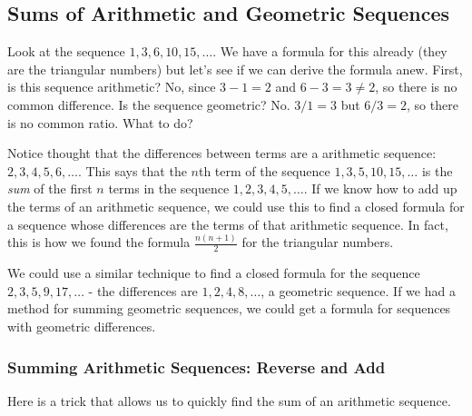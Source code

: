 \documentclass[12pt]{article}
\begin{document}
\subsection{Sums of Arithmetic and Geometric Sequences}

Look at the sequence $1, 3, 6, 10, 15,\ldots$.  We have a formula for this already (they are the triangular numbers) but let's see if we can derive the formula anew.  First, is this sequence arithmetic?  No, since $3-1 = 2$ and $6-3 = 3 \ne 2$, so there is no common difference.  Is the sequence geometric?  No.  $3/1 = 3$ but $6/3 = 2$, so there is no common ratio.  What to do?  

Notice thought that the differences between terms are a arithmetic sequence: $2, 3, 4, 5, 6,\ldots$.  This says that the $n$th term of the sequence $1,3,5,10,15,\ldots$ is the {\em sum} of the first $n$ terms in the sequence $1,2,3,4,5,\ldots$.  If we know how to add up the terms of an arithmetic sequence, we could use this to find a closed formula for a sequence whose differences are the terms of that arithmetic sequence.  In fact, this is how we found the formula $\frac{n(n+1)}{2}$ for the triangular numbers.

We could use a similar technique to find a closed formula for the sequence $2, 3, 5, 9, 17, \ldots$ - the differences are $1, 2, 4, 8, \ldots$, a geometric sequence.  If we had a method for summing geometric sequences, we could get a formula for sequences with geometric differences.

\subsubsection*{Summing Arithmetic Sequences: Reverse and Add}
Here is a trick that allows us to quickly find the sum of an arithmetic sequence. 
\end{document}
